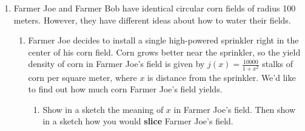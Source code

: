 \documentclass[main]{subfiles}
\begin{document}
\begin{enumerate}
\item 
  Farmer Joe and Farmer Bob have identical circular corn fields of
  radius 100 meters.  However, they have different ideas about how to
  water their fields.
  \begin{enumerate}
  \item Farmer Joe decides to install a single high-powered sprinkler
    right in the center of his corn field.  Corn grows better near the
    sprinkler, so the yield density of corn in Farmer Joe's field is given
    by $\displaystyle j(x) = \frac{10000}{1 + x^2}$ stalks of corn per
    square meter, where $x$ is distance from the sprinkler.  We'd like to
    find out how much corn Farmer Joe's field yields.

    \begin{enumerate}
    \item
      \begin{problem}[1.5in]
        Show in a sketch the meaning of $x$ in Farmer Joe's field.  Then
        show in a sketch how you would \textbf{slice} Farmer Joe's field.
      \end{problem}    


\end{enumerate}
\end{enumerate}
\end{enumerate}
\end{document}
